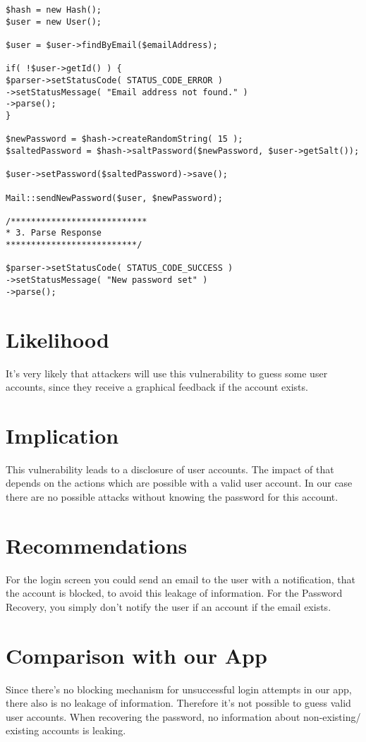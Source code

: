 \begin{lstlisting}[caption= Validating Email before generating new Passowrd  line 54-59 ,label=listing:forgotPassword]
$hash = new Hash();
$user = new User();

$user = $user->findByEmail($emailAddress);

if( !$user->getId() ) {
$parser->setStatusCode( STATUS_CODE_ERROR )
->setStatusMessage( "Email address not found." )
->parse();
}

$newPassword = $hash->createRandomString( 15 );
$saltedPassword = $hash->saltPassword($newPassword, $user->getSalt());

$user->setPassword($saltedPassword)->save();

Mail::sendNewPassword($user, $newPassword);

/***************************
* 3. Parse Response
**************************/

$parser->setStatusCode( STATUS_CODE_SUCCESS )
->setStatusMessage( "New password set" )
->parse();
\end{lstlisting}



\section{Likelihood}
It's very likely that attackers will use this vulnerability to guess some user accounts, since they receive a graphical feedback if the account exists.


\section{Implication} 
This vulnerability leads to a disclosure of user accounts. The impact of that depends on the actions which are possible with a valid user account. In our case there are no possible attacks without knowing the password for this account.


\section{Recommendations}
For the login screen  you could send an email to the user with a notification, that the account is blocked, to avoid this leakage of information. For the Password Recovery, you simply don't notify the user if an account if the email exists. 

\section{Comparison with our App}
Since there's no blocking mechanism for unsuccessful login attempts in our app, there also is no leakage of information. Therefore it's not possible to guess valid user accounts. When recovering the password, no information about non-existing/ existing accounts is leaking.

